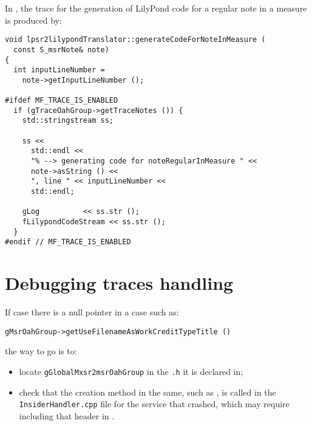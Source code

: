 In , the trace for the generation of LilyPond code for a regular note in a measure is produced by:
\begin{lstlisting}[language=CPlusPlus]
void lpsr2lilypondTranslator::generateCodeForNoteInMeasure (
  const S_msrNote& note)
{
  int inputLineNumber =
    note->getInputLineNumber ();

#ifdef MF_TRACE_IS_ENABLED
  if (gTraceOahGroup->getTraceNotes ()) {
    std::stringstream ss;

    ss <<
      std::endl <<
      "% --> generating code for noteRegularInMeasure " <<
      note->asString () <<
      ", line " << inputLineNumber <<
      std::endl;

    gLog          << ss.str ();
    fLilypondCodeStream << ss.str ();
  }
#endif // MF_TRACE_IS_ENABLED

\end{lstlisting}


\section{Debugging traces handling}

If case there is a null pointer in a case such as:
\begin{lstlisting}[language=CPlusPlus]
    gMsrOahGroup->getUseFilenameAsWorkCreditTypeTitle ()
\end{lstlisting}

the way to go is to:%
\begin{itemize}
\item locate {\tt gGlobalMxsr2msrOahGroup} in the {\tt *.h} it is declared in;
\item check that the creation method in the same, such as , is called in the {\tt *InsiderHandler.cpp} file for the service that crashed, which may require including that  header in .
\end{itemize}

